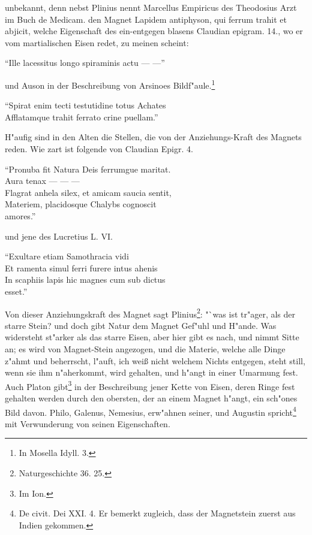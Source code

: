 \documentclass[a4paper, 11pt, oneside, polutonikogreek, german]{article}
\begin{document}
unbekannt, denn nebst Plinius nennt Marcellus Empiricus des Theodosius Arzt im Buch de Medicam. den Magnet Lapidem antiphyson, qui ferrum trahit et abjicit, welche Eigenschaft des ein-entgegen blasens Claudian epigram. 14., wo er vom martialischen Eisen redet, zu meinen scheint:

"`Ille lacessitus longo spiraminis actu --- ---"'

und Auson in der Beschreibung von Arsinoes Bildf"aule.\footnote{In Mosella Idyll. 3.}

"`Spirat enim tecti testutidine totus Achates\\
\hspace*{0.5cm} Afflatamque trahit ferrato crine puellam."'

H"aufig sind in den Alten die Stellen, die von der Anziehungs-Kraft des Magnets reden. Wie zart ist folgende von Claudian Epigr. 4.

"`Pronuba fit Natura Deis ferrumgue maritat.\\
\hspace*{0.5cm} Aura tenax --- --- ---\\
\hspace*{0.5cm} Flagrat anhela silex, et amicam saucia sentit,\\
\hspace*{0.5cm} Materiem, placidosque Chalybs cognoscit\\
\hspace*{1.5cm} amores."'

und jene des Lucretius L. VI.

"`Exultare etiam Samothracia vidi\\
\hspace*{0.5cm} Et ramenta simul ferri furere intus ahenis\\
\hspace*{0.5cm} In scaphiis lapis hic magnes cum sub dictus\\
\hspace*{1.5cm} esset."'

Von dieser Anziehungskraft des Magnet sagt Plinius\footnote{Naturgeschichte 36. 25.}: "`was ist tr"ager, als der starre Stein? und doch gibt Natur dem Magnet Gef"uhl und H"ande. Was widersteht st"arker als das starre Eisen, aber hier gibt es nach, und nimmt Sitte an; es wird von Magnet-Stein angezogen, und die Materie, welche alle Dinge z"ahmt und beherrscht, l"auft, ich weiß nicht welchem Nichts entgegen, steht still, wenn sie ihm n"aherkommt, wird gehalten, und h"angt in einer Umarmung fest. Auch Platon gibt\footnote{Im Ion.} in der Beschreibung jener Kette von Eisen, deren Ringe fest gehalten werden durch den obersten, der an einem Magnet h"angt, ein sch"ones Bild davon. Philo, Galenus, Nemesius, erw"ahnen seiner, und Augustin spricht\footnote{De civit. Dei XXI. 4. Er bemerkt zugleich, dass der Magnetstein zuerst aus Indien gekommen.} mit Verwunderung von seinen Eigenschaften.
\end{document}
